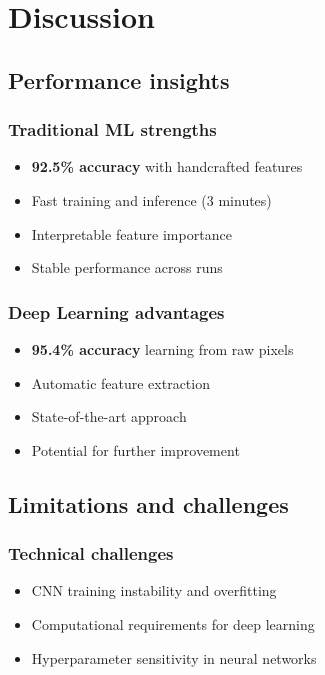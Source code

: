\documentclass[11pt]{article}
\begin{document}
\section{Discussion}

\subsection{Performance insights}

\subsubsection{Traditional ML strengths}
\begin{itemize}
    \item \textbf{92.5\% accuracy} with handcrafted features
    \item Fast training and inference (3 minutes)
    \item Interpretable feature importance
    \item Stable performance across runs
\end{itemize}

\subsubsection{Deep Learning advantages}
\begin{itemize}
    \item \textbf{95.4\% accuracy} learning from raw pixels
    \item Automatic feature extraction
    \item State-of-the-art approach
    \item Potential for further improvement
\end{itemize}

\subsection{Limitations and challenges}

\subsubsection{Technical challenges}
\begin{itemize}
    \item CNN training instability and overfitting
    \item Computational requirements for deep learning
    \item Hyperparameter sensitivity in neural networks
\end{itemize}
\end{document}
